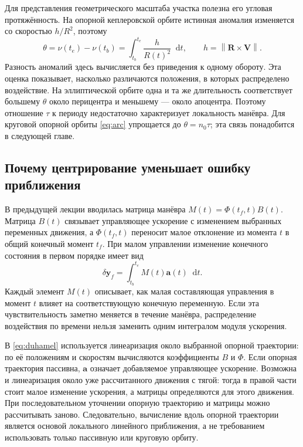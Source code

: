 \documentclass[a4paper,11pt]{article}
\newcommand{\dd}{\mathop{}\!\mathrm d}
\newcommand{\vect}[1]{\boldsymbol{#1}}
\newcommand{\norm}[1]{\left\lVert#1\right\rVert}
\numberwithin{equation}{section}
\begin{document}
Для представления геометрического масштаба участка полезна
его угловая протяжённость. На опорной кеплеровской орбите
истинная аномалия изменяется со скоростью $h/R^2$, поэтому
\begin{equation}
\theta=\nu(t_e)-\nu(t_b)
      =\int_{t_b}^{t_e}\frac{h}{R(t)^2}\dd t,
\qquad h=\norm{\vect R\times\vect V}.
\label{eq:arc}
\end{equation}
Разность аномалий здесь вычисляется без приведения к одному
обороту. Эта оценка показывает, насколько различаются положения,
в которых распределено воздействие. На эллиптической орбите
одна и та же длительность соответствует большему $\theta$
около перицентра и меньшему --- около апоцентра.
Поэтому отношение $\tau$ к периоду недостаточно характеризует
локальность манёвра. Для круговой опорной орбиты
\eqref{eq:arc} упрощается до $\theta=n_0\tau$;
эта связь понадобится в следующей главе.

\subsection{Почему центрирование уменьшает ошибку приближения}

В предыдущей лекции вводилась матрица манёвра
$M(t)=\Phi(t_f,t)B(t)$.
Матрица $B(t)$ связывает управляющее ускорение с изменением
выбранных переменных движения, а $\Phi(t_f,t)$ переносит
малое отклонение из момента $t$ в общий конечный момент $t_f$.
При малом управлении изменение конечного состояния в первом
порядке имеет вид
\begin{equation}
\delta\vect y_f=\int_{t_b}^{t_e}M(t)\vect a(t)\dd t.
\label{eq:duhamel}
\end{equation}
Каждый элемент $M(t)$ описывает, как малая составляющая
управления в момент $t$ влияет на соответствующую конечную
переменную. Если эта чувствительность заметно меняется
в течение манёвра, распределение воздействия по времени
нельзя заменить одним интегралом модуля ускорения.

В \eqref{eq:duhamel} используется линеаризация около выбранной
опорной траектории: по её положениям и скоростям вычисляются
коэффициенты $B$ и $\Phi$. Если опорная траектория пассивна,
$\vect a$ означает добавляемое управляющее ускорение.
Возможна и линеаризация около уже рассчитанного движения
с тягой: тогда в правой части стоит малое изменение ускорения,
а матрицы определяются для этого движения. При последовательном
уточнении опорную траекторию и матрицы можно рассчитывать заново.
Следовательно, вычисление вдоль опорной траектории является
основой локального линейного приближения, а не требованием
использовать только пассивную или круговую орбиту.
\end{document}
